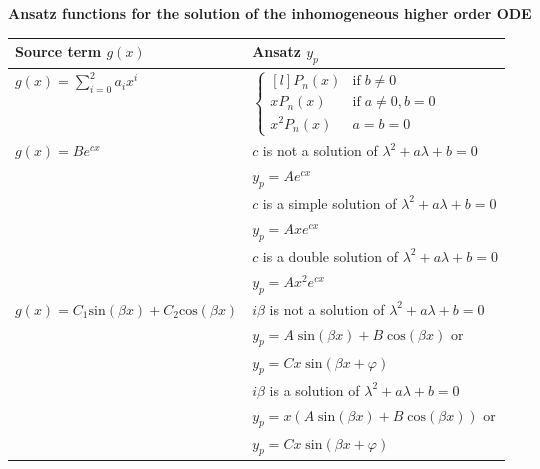\textbf{Ansatz functions for the solution of the inhomogeneous higher order ODE}\\
\begin{table}[H]
  \centering
  \scriptsize
  \begin{tabular}{l|l}
  Source term $g(x)$    & Ansatz $y_p$\\ \hline
  $g(x) = \sum_{i=0}^2 a_i x^i$ &
  $\left \{\begin{matrix*}[l]
    P_n(x)    & \text{if}\; b \neq 0\\
    xP_n(x)   & \text{if}\; a \neq 0, b = 0\\
    x^2P_n(x) & a=b=0
  \end{matrix*}\right.$ \\ \hline
  \multirow{6}{*}{$g(x) = Be^{cx}$} & $c$ is not a solution of $\lambda^2 + a\lambda + b = 0$\\
                                    & $y_p = Ae^{cx}$    \\ \cline{2-2}
                                    & $c$ is a simple solution of $\lambda^2 + a\lambda + b = 0$\\
                                    & $y_p = Axe^{cx}$   \\ \cline{2-2}
                                    & $c$ is a double solution of $\lambda^2 + a\lambda + b = 0$\\
                                    & $y_p = Ax^2e^{cx}$ \\ \hline
  \multirow{6}{*}{$g(x) = C_1 \text{sin}(\beta x) + C_2 \text{cos}(\beta x)$}
                        & $i\beta$ is not a solution of $\lambda^2 + a\lambda + b = 0$\\
                        & $y_p = A\;\text{sin}(\beta x) + B\;\text{cos}(\beta x)$ or \\
                        & $y_p = Cx\;\text{sin}(\beta x + \varphi)$ \\ \cline{2-2}
                        & $i\beta$ is a solution of $\lambda^2 + a\lambda + b = 0$\\
                        & $y_p = x\left(A\;\text{sin}(\beta x) + B\;\text{cos}(\beta x)\right)$ or \\
                        & $y_p = Cx\;\text{sin}(\beta x + \varphi)$
  \end{tabular}
\end{table}

